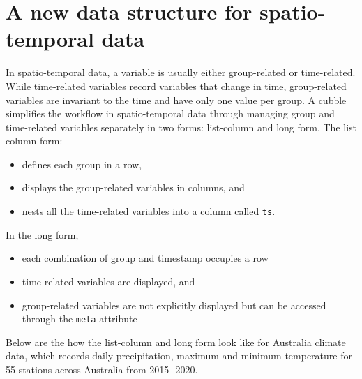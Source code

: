 \documentclass{article}
\begin{document}
\hypertarget{a-new-data-structure-for-spatio-temporal-data}{%
\section{A new data structure for spatio-temporal
data}\label{a-new-data-structure-for-spatio-temporal-data}}

In spatio-temporal data, a variable is usually either group-related or
time-related. While time-related variables record variables that change
in time, group-related variables are invariant to the time and have only
one value per group. A cubble simplifies the workflow in spatio-temporal
data through managing group and time-related variables separately in two
forms: list-column and long form. The list column form:

\begin{itemize}
\tightlist
\item
  defines each group in a row,
\item
  displays the group-related variables in columns, and
\item
  nests all the time-related variables into a column called \texttt{ts}.
\end{itemize}

In the long form,

\begin{itemize}
\tightlist
\item
  each combination of group and timestamp occupies a row
\item
  time-related variables are displayed, and
\item
  group-related variables are not explicitly displayed but can be
  accessed through the \texttt{meta} attribute
\end{itemize}

Below are the how the list-column and long form look like for Australia
climate data, which records daily precipitation, maximum and minimum
temperature for 55 stations across Australia from 2015- 2020.

\newpage
\end{document}
